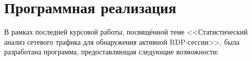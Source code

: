 \documentclass[spec, och, diploma]{SCWorks}
\begin{document}





\section{Программная реализация}

В рамках последней курсовой работы, посвящённой теме <<Статистический анализ сетевого трафика для обнаружения активной RDP-сессии>>, была разработана 
программа, предоставляющая следующие возможности:
\end{document}
